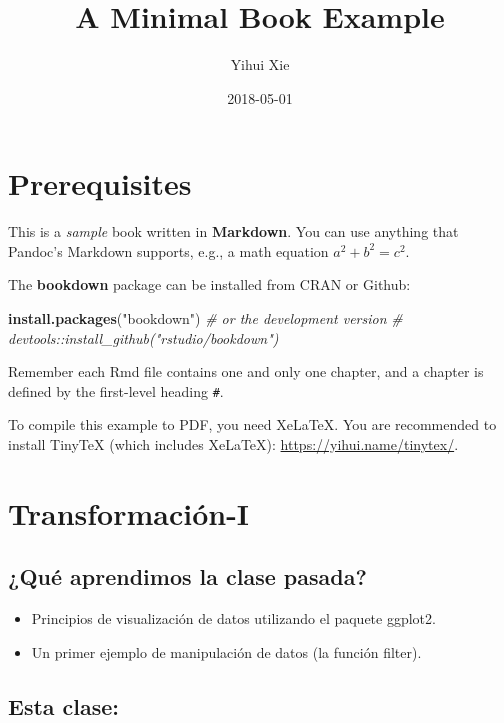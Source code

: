 \documentclass[]{book}
\title{A Minimal Book Example}
\author{Yihui Xie}
\date{2018-05-01}
\newenvironment{Shaded}{\begin{snugshade}}{\end{snugshade}}
\newcommand{\KeywordTok}[1]{\textcolor[rgb]{0.13,0.29,0.53}{\textbf{#1}}}
\newcommand{\StringTok}[1]{\textcolor[rgb]{0.31,0.60,0.02}{#1}}
\newcommand{\CommentTok}[1]{\textcolor[rgb]{0.56,0.35,0.01}{\textit{#1}}}
\newcommand{\NormalTok}[1]{#1}
\providecommand{\tightlist}{%
  \setlength{\itemsep}{0pt}\setlength{\parskip}{0pt}}
\theoremstyle{definition}
\theoremstyle{definition}
\theoremstyle{definition}
\theoremstyle{remark}
\begin{document}
\maketitle

{
\setcounter{tocdepth}{1}
\tableofcontents
}
\chapter{Prerequisites}\label{prerequisites}

This is a \emph{sample} book written in \textbf{Markdown}. You can use
anything that Pandoc's Markdown supports, e.g., a math equation
\(a^2 + b^2 = c^2\).

The \textbf{bookdown} package can be installed from CRAN or Github:

\begin{Shaded}
\begin{Highlighting}[]
\KeywordTok{install.packages}\NormalTok{(}\StringTok{"bookdown"}\NormalTok{)}
\CommentTok{# or the development version}
\CommentTok{# devtools::install_github("rstudio/bookdown")}
\end{Highlighting}
\end{Shaded}

Remember each Rmd file contains one and only one chapter, and a chapter
is defined by the first-level heading \texttt{\#}.

To compile this example to PDF, you need XeLaTeX. You are recommended to
install TinyTeX (which includes XeLaTeX):
\url{https://yihui.name/tinytex/}.

\chapter{Transformación-I}\label{transformacion-i}

\section{¿Qué aprendimos la clase
pasada?}\label{que-aprendimos-la-clase-pasada}

\begin{itemize}
\tightlist
\item
  Principios de visualización de datos utilizando el paquete ggplot2.
\item
  Un primer ejemplo de manipulación de datos (la función filter).
\end{itemize}

\section{Esta clase:}\label{esta-clase}
\end{document}
